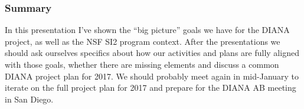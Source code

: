 \begin{frame}
\frametitle{Summary}

In this presentation I've shown the ``big picture'' goals we have for the DIANA project, as well as the NSF SI2 program context.
\vskip 0.15in
After the presentations we should ask ourselves specifics about how our activities and plans are fully aligned with those goals, whether there are missing elements and discuss a common DIANA project plan for 2017.
\vskip 0.15in
We should probably meet again in mid-January to iterate on the full project plan for 2017 and prepare for the DIANA AB meeting in San Diego.
\end{frame}


